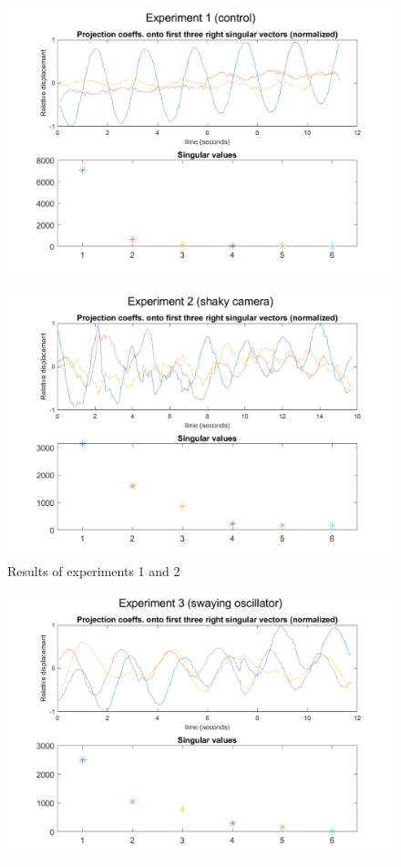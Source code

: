 \documentclass{article}
\begin{document}
\begin{figure}[!h]
	\centering
	\includegraphics[scale=0.62]{fig1}
\end{figure}
\begin{figure}[!h]
	\centering
	\includegraphics[scale=0.62]{fig2}
	\caption{Results of experiments 1 and 2}
\end{figure}
\begin{figure}[!h]
	\centering
	\includegraphics[scale=0.62]{fig3}
\end{figure}
\end{document}
